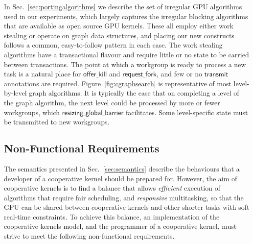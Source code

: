 \documentclass[sigconf]{acmart}
\makeatletter
\renewcommand\paragraph{\@startsection{paragraph}{4}{\z@}%
  {-.5\baselineskip \@plus -2\p@ \@minus -.2\p@}%
  {-3.5\p@}%
  {\bfseries\@parfont}}
\newcommand{\myfiglong}{Figure~}
\newcommand{\mysec}{Sec.~}
\newcommand{\transmit}{\mathsf{transmit}}
\newcommand{\offerfork}{\mathsf{request\_fork}}
\newcommand{\offerkill}{\mathsf{offer\_kill}}
\newcommand{\resizingglobalbarrier}{\mathsf{resizing\_global\_barrier}}
\makeatother
\begin{document}
{
In \mysec\ref{sec:portingalgorithms} we describe the set of irregular GPU algorithms used
in our experiments, which largely captures the irregular blocking
algorithms that are available as open source GPU kernels.  These all
employ either work stealing or operate on graph data structures, and placing our new constructs follows a common, easy-to-follow pattern in each case.
%
The work stealing algorithms have a transactional flavour
and require little or no state to be carried between transactions.  The point at which a workgroup is ready to process a new task is a natural place for $\offerkill$ and $\offerfork$, and few or no $\transmit$ annotations are required.
%
\myfiglong\ref{fig:cgraphsearch} is representative of
most level-by-level graph algorithms.
It is typically the case that on completing a level of
the graph algorithm, the next level could be processed by more or
fewer workgroups, which $\resizingglobalbarrier$
facilitates.  Some level-specific state must be transmitted to new workgroups.



\subsection{Non-Functional Requirements}\label{sec:nonfunctional}

The semantics presented in \mysec\ref{sec:semantics} describe the
behaviours that a developer of a cooperative kernel should be prepared
for.
%
However, the aim of cooperative kernels is to find a balance that
allows \emph{efficient} execution of algorithms that require fair scheduling, and
\emph{responsive} multitasking, so that the GPU can be shared between
cooperative kernels and other shorter tasks with soft real-time constraints.
%
To achieve this balance, an implementation of the cooperative
kernels model, and the programmer of a cooperative kernel, must strive
to meet the following non-functional requirements.


}
\end{document}
